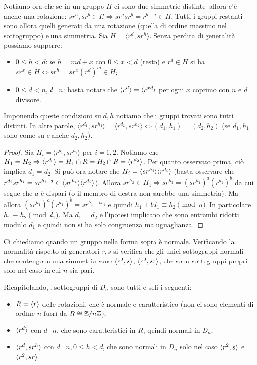 Notiamo ora che se in un gruppo $H$ ci sono due simmetrie distinte, allora c'è anche una rotazione: $sr^a, sr^b \in H \Rightarrow sr^asr^b = r^{b-a} \in H$. Tutti i gruppi restanti sono allora quelli generati da una rotazione (quella di ordine massimo nel sottogruppo) e una simmetria. Sia $H = \langle r^d, sr^h \rangle$. Senza perdita di generalità possiamo supporre:
\begin{itemize}
    \item $0 \leq h < d$: se $h = md + x$ con $0 \leq x < d$ (resto) e $r^d \in H$ si ha $sr^x\in H \iff sr^h = sr^x(r^d)^m \in H$;
    \item $0 \leq d < n$, $d \mid n$: basta notare che $\langle r^d \rangle = \langle r^{xd} \rangle$ per ogni $x$ coprimo con $n$ e $d$ divisore.
\end{itemize}
Imponendo queste condizioni su $d,h$ notiamo che i gruppi trovati sono tutti distinti. In altre parole, $\langle r^{d_1}, sr^{h_1} \rangle = \langle r^{d_2}, sr^{h_2} \rangle \iff (d_1,h_1) = (d_2,h_2)$ (se $d_1,h_1$ sono come su e anche $d_2,h_2$).
\begin{proof}
    Sia $H_i = \langle r^{d_i}, sr^{h_i} \rangle$ per $i = 1,2$. Notiamo che $H_1 = H_2 \Rightarrow \langle r^{d_1} \rangle = H_1 \cap R = H_2 \cap R = \langle r^{d_2} \rangle$. Per quanto osservato prima, ciò implica $d_1 = d_2$. Si può ora notare che $H_i = \langle sr^{h_i} \rangle\langle r^{d_i} \rangle$ (basta osservare che $r^{d_i}sr^{h_i}=sr^{h_i-d} \in \langle sr^{h_i} \rangle\langle r^{d_i} \rangle$). Allora $sr^{h_2} \in H_1  \Rightarrow sr^{h_2} = (sr^{h_1})^a(r^{d_1})^b$ da cui segue che $a$ è dispari (o il membro di destra non sarebbe una simmetria). Ma allora $(sr^{h_1})^a(r^{d_1})^b=sr^{h_1+bd_1}$ e quindi $h_1 + b d_1  \equiv h_2 \pmod{n}$. In particolare $h_1 \equiv h_2 \pmod{d_1}$. Ma $d_1 = d_2$ e l'ipotesi implicano che sono entrambi ridotti modulo $d_1$ e quindi non si ha solo congruenza ma uguaglianza.
\end{proof}
Ci chiediamo quando un gruppo nella forma sopra è normale. Verificando la normalità rispetto ai generatori $r,s$ si verifica che gli unici sottogruppi normali che contengono una simmetria sono $\langle r^2, s \rangle$, $\langle r^2, sr \rangle$, che sono sottogruppi propri solo nel caso in cui $n$ sia pari.

Ricapitolando, i sottogruppi di $D_n$ sono tutti e soli i seguenti:
\begin{itemize}
    \item $R = \langle r \rangle$ delle rotazioni, che è normale e caratteristico (non ci sono elementi di ordine $n$ fuori da $R\cong \mathbb{Z}/n\mathbb{Z}$);
    \item $\langle r^d \rangle$ con $d\mid n$, che sono caratteristici in $R$, quindi normali in $D_n$;
    \item $\langle r^d, sr^h \rangle$ con $d \mid n, 0\leq h <d$, che sono normali in $D_n$ solo nel caso $\langle r^2, s \rangle$ e $\langle r^2, sr \rangle$.
\end{itemize}

